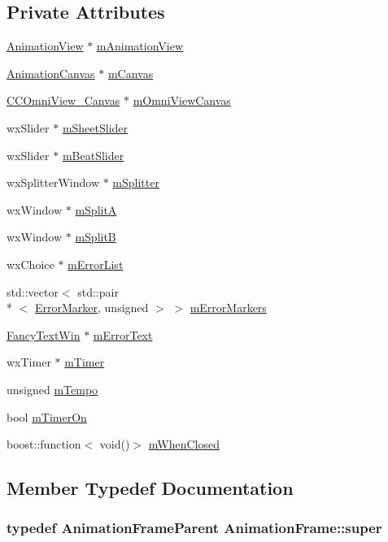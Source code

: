 \subsection*{Private Attributes}
\begin{DoxyCompactItemize}
\item 
\hyperlink{a00015}{Animation\-View} $\ast$ \hyperlink{a00012_a8eaf0667f46fd0a32d400513fc0dbe6f}{m\-Animation\-View}
\item 
\hyperlink{a00011}{Animation\-Canvas} $\ast$ \hyperlink{a00012_a6b272e1e5149c0852be68df793d91319}{m\-Canvas}
\item 
\hyperlink{a00049}{C\-C\-Omni\-View\-\_\-\-Canvas} $\ast$ \hyperlink{a00012_a5aefb21e1f10427c4c39e57cba2bea9a}{m\-Omni\-View\-Canvas}
\item 
wx\-Slider $\ast$ \hyperlink{a00012_a24a43b9bb1c10f0b33d1ffaf6a8bbc0c}{m\-Sheet\-Slider}
\item 
wx\-Slider $\ast$ \hyperlink{a00012_a88521e7acd54e1b979933cea349093a5}{m\-Beat\-Slider}
\item 
wx\-Splitter\-Window $\ast$ \hyperlink{a00012_a0834dc7f3ff34dea334cf0c1d6bf5333}{m\-Splitter}
\item 
wx\-Window $\ast$ \hyperlink{a00012_aaf2b976d3be7e9c01fd011349933506a}{m\-Split\-A}
\item 
wx\-Window $\ast$ \hyperlink{a00012_af4f663056a3e3452d154976cf4674a92}{m\-Split\-B}
\item 
wx\-Choice $\ast$ \hyperlink{a00012_af7449f029e00d8a7865dca8a2e89674f}{m\-Error\-List}
\item 
std\-::vector$<$ std\-::pair\\*
$<$ \hyperlink{a00098}{Error\-Marker}, unsigned $>$ $>$ \hyperlink{a00012_a9e3504eaefd868db5e1cf25b68e4c164}{m\-Error\-Markers}
\item 
\hyperlink{a00099}{Fancy\-Text\-Win} $\ast$ \hyperlink{a00012_a9afe128fc249c04a4b77a3ebffc0e922}{m\-Error\-Text}
\item 
wx\-Timer $\ast$ \hyperlink{a00012_aa48d3d2e5cd0c3d39153cdc8b1581994}{m\-Timer}
\item 
unsigned \hyperlink{a00012_a192f6bee3cbd7e25c9d64b34e605decd}{m\-Tempo}
\item 
bool \hyperlink{a00012_a73516f06167cd8f8cb18d6d9c213196f}{m\-Timer\-On}
\item 
boost\-::function$<$ void()$>$ \hyperlink{a00012_aceadfa02d59d86be954eda1e69245465}{m\-When\-Closed}
\end{DoxyCompactItemize}


\subsection{Member Typedef Documentation}
\hypertarget{a00012_a090eb07704cc6d7005dc5cd99da6d8bd}{
\subsubsection[{super}]{\setlength{\rightskip}{0pt plus 5cm}typedef {\bf Animation\-Frame\-Parent} {\bf Animation\-Frame\-::super}}}\label{a00012_a090eb07704cc6d7005dc5cd99da6d8bd}


